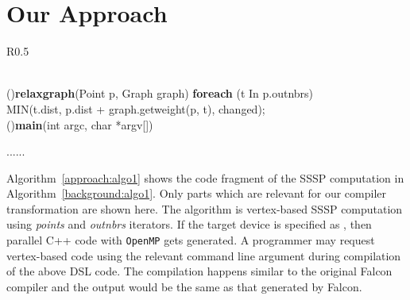 \section{Our Approach}\label{sec:approach}
\begin{wrapfigure}{R}{0.5\textwidth}
\begin{algorithm}[H]
\scriptsize
{}
\fontsize{8.2pt}{5pt}\\
\Fn(){\textbf{relaxgraph}(Point  p, Graph  graph)} {
                        \textbf{foreach} (t In p.outnbrs)\label{line:foreach21}\\
        \hspace{0.05in} MIN(t.dist, p.dist + graph.getweight(p, t), changed);    \label{line:modidist1}\\%
}
\Fn(){\textbf{main}(int argc, char *argv[])} {
       ......\\
        \label{line:ssspendlopp1}

        }
\caption{SSSP: iterating over Points in Falcon}
\label{approach:algo1}
\end{algorithm}
\end{wrapfigure}

Algorithm~\ref{approach:algo1} shows the code fragment of the SSSP computation in Algorithm~\ref{background:algo1}.
Only parts  which are relevant for our compiler transformation are shown here.
The algorithm is vertex-based SSSP computation using {\it points} and {\it outnbrs} iterators.
If the target device is specified as \CPU, then parallel C++ code with {\tt OpenMP} gets generated. A  programmer may request  vertex-based code using the relevant command line argument  during compilation of the above DSL code. The compilation happens similar to the original Falcon compiler and the output would be the same as that generated by Falcon.

